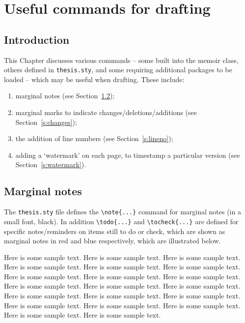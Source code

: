 \chapter{Useful commands for drafting}\label{c:drafting}

\section{Introduction}

This Chapter discusses various commands -- some built into the memoir
class, others defined in \verb|thesis.sty|, and some requiring
additional packages to be loaded -- which may be useful when drafting.
These include:
%
\begin{enumerate}
%
\item marginal notes (see Section~\ref{s:notes});
%
\item marginal marks to indicate changes/deletions/additions (see
Section~\ref{s:changes});
%
\item the addition of line numbers (see Section~\ref{s:lineno});
%
\item adding a `watermark' on each page, to timestamp a particular
version (see Section~\ref{s:watermark}).
%
\end{enumerate}

\section{Marginal notes}\label{s:notes}

The \verb|thesis.sty| file defines the \verb|\note{...}| command for
marginal notes (in a small font,
black). In addition \verb|\todo{...}| and \verb|\tocheck{...}| are
defined for specific notes/reminders on items still to do or check,
which are shown as marginal notes in red and blue respectively, which
are illustrated below.

Here is some sample text.
%
%
Here is some sample text. Here is some sample text. Here is some sample
text. Here is some sample text. Here is some sample text. Here is some
sample text. Here is some sample text. Here is some sample text. Here is
some sample text.
%
%
Here is some sample text. Here is some sample text. Here is some sample
text. Here is some sample text. Here is some sample text. Here is some
sample text. Here is some sample text. Here is some sample text. Here is
some sample text. Here is some sample text.


